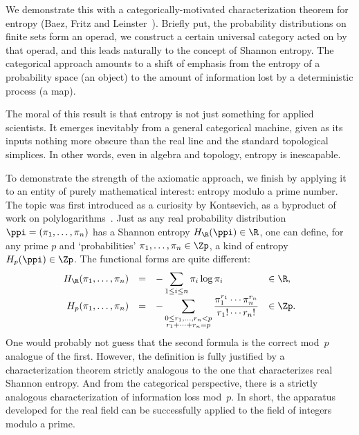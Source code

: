 We demonstrate this with a categorically-motivated characterization theorem
for entropy (Baez, Fritz and Leinster~\cite{CETIL}).  Briefly put, the
probability distributions on finite sets form an operad, we
construct a certain universal category acted on by that operad, and this
leads naturally to the concept of Shannon entropy.  The categorical
approach amounts to a shift of emphasis from the entropy of a probability
space (an object) to the amount of information lost by a deterministic
process (a map).

The moral of this result is that entropy is not just something for applied
scientists.  It emerges inevitably from a general categorical machine,
given as its inputs nothing more obscure than the real line and the
standard topological simplices.  In other words, even in algebra and
topology, entropy is inescapable.

To demonstrate the strength of the axiomatic approach, we finish by
applying it to an entity of purely mathematical interest: entropy modulo a
prime number.  The topic was first introduced as a curiosity by
Kontsevich,%
%
% 
as a byproduct of work on polylogarithms~\cite{KontOHL}.  Just as any real
probability distribution $\ppi = (\pi_1, \ldots, \pi_n)$ has a Shannon
entropy $H_\R(\ppi) \in \R$, one can define, for any
prime%
%
%
$p$ and `probabilities' $\pi_1, \ldots, \pi_n \in \Zp$, a kind of entropy
$H_p(\ppi) \in \Zp$.  The functional forms are quite different:
\[
\begin{array}{rcll}
H_\R(\pi_1, \ldots, \pi_n)      &
= &
\displaystyle
-\sum_{1 \leq i \leq n} \pi_i \log \pi_i
&\in \R, \\[1.5ex]
H_p(\pi_1, \ldots, \pi_n)       &
=&
\displaystyle
-\sum_{\substack{0 \leq r_1, \ldots, r_n < p\\ r_1 + \cdots + r_n = p}}
\frac{\pi_1^{r_1} \cdots \pi_n^{r_n}}{r_1! \cdots r_n!}
&\in \Zp.
\end{array}
\]
One would probably not guess that the second formula is the correct mod~$p$
analogue of the first.  However, the definition is fully justified by a
characterization theorem strictly analogous to the one that characterizes
real Shannon entropy.  And from the categorical perspective, there is a
strictly analogous characterization of information loss mod~$p$.  In short,
the apparatus developed for the real field can be successfully applied to
the field of integers modulo a prime.

\newpage
\introbreak


